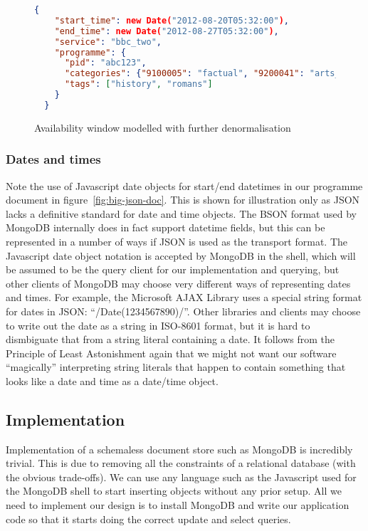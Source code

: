 \documentclass[11pt,a4paper]{article}
\begin{document}
\begin{figure}[p]
\begin{lstlisting}[language=json]
  {
    "start_time": new Date("2012-08-20T05:32:00"),
    "end_time": new Date("2012-08-27T05:32:00"),
    "service": "bbc_two",
    "programme": {
      "pid": "abc123",
      "categories": {"9100005": "factual", "9200041": "arts_culture_and_the_media"},
      "tags": ["history", "romans"]
    }
  }
\end{lstlisting}
  \caption{Availability window modelled with further denormalisation}
  \label{fig:mongo-availability-denormal}
\end{figure}

\subsubsection{Dates and times}

Note the use of Javascript date objects for start/end datetimes in our
programme document in figure~\ref{fig:big-json-doc}. This is
shown for illustration only as JSON lacks a definitive standard for date
and time objects. The BSON format used by MongoDB internally does
in fact support datetime fields, but this can be represented in a
number of ways if JSON is used as the transport format. The Javascript
date object notation is accepted by MongoDB in the shell, which
will be assumed to be the query client for our implementation and
querying, but other clients of MongoDB may choose very different
ways of representing dates and times. For example, the
Microsoft AJAX Library uses a special string format for dates in JSON:
``/Date(1234567890)/''. \cite{ms-ajax-json-dates} Other libraries
and clients may choose to write out the date as a string in ISO-8601 format,
but it is hard to dismbiguate that from a string literal containing
a date. It follows from the Principle of Least Astonishment
\cite{saltzer2009principles} again
that we might not want our software ``magically'' interpreting
string literals that happen to contain something that looks like a date
and time as a date/time object.

\subsection{Implementation}
\label{sec:mongo-implementation}

Implementation of a schemaless document store such as MongoDB is
incredibly trivial. This is due to removing all the constraints
of a relational database (with the obvious trade-offs). We can use
any language such as the Javascript used for the MongoDB shell to
start inserting objects without any prior setup. All we need to implement
our design is to install MongoDB and write our application code so that
it starts doing the correct update and select queries.
\end{document}
